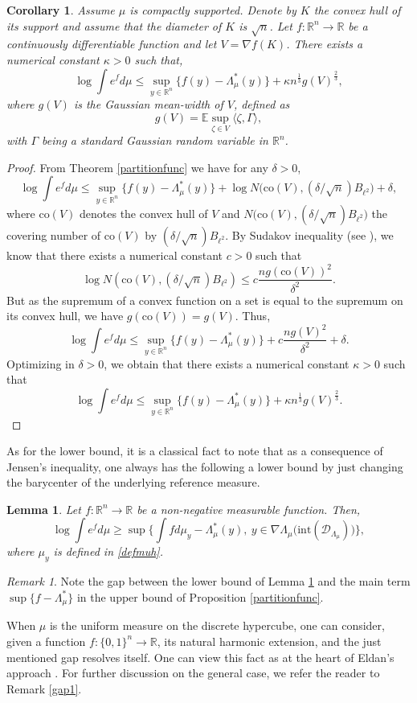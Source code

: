 \documentclass[aop,preprint]{imsart}
\newcommand\RR{\mathbb{R}}
\newcommand\EE{\mathbb{E}}
\numberwithin{equation}{section}
\theoremstyle{definition}
\theoremstyle{plain}
\newtheorem{Lem}[Def]{Lemma}
\newtheorem{Cor}[Def]{Corollary}
\theoremstyle{remark}
\newtheorem{Rem}[Def]{Remark}
\begin{document}
\begin{Cor}\label{GW}
Assume $\mu$ is compactly supported. Denote by $K$ the convex hull of its support and assume that the diameter of $K$ is $\sqrt{n}$. Let $f : \RR^n \to \RR$ be a continuously differentiable function and let $V = \nabla f(K)$. There exists a numerical constant $\kappa>0$ such that,
$$\log \int e^{f} d\mu \leq \sup_{y \in \RR^n} \{ f(y) -\Lambda^*_\mu(y)\}  +\kappa n^{\frac{1}{3}} g(V)^{\frac{2}{3}},$$
where $g(V)$ is the Gaussian mean-width of $V$, defined as
$$ g(V) = \EE \sup_{\zeta \in V} \langle \zeta , \Gamma \rangle,$$
with $\Gamma$ being a standard Gaussian random variable in $\RR^n$.
\end{Cor}
\begin{proof}
From Theorem \ref{partitionfunc} we have for any $\delta>0$,
$$\log \int e^{f} d\mu \leq \sup_{y \in \RR^n}  \{ f(y) -\Lambda^*_\mu(y)\}  + \log N\big(\mathrm{co}(V), (\delta/\sqrt{n}) B_{\ell^2}\big) +  \delta,$$
where $\mathrm{co}(V)$ denotes the convex hull of $V$ and $N\big(\mathrm{co}(V), (\delta/\sqrt{n}) B_{\ell^2}\big)$ the covering number of $\mathrm{co}(V)$ by $(\delta/\sqrt{n}) B_{\ell^2}$. By Sudakov inequality (see \cite[Theorem 3.18]{LT}), we know that there exists a numerical constant $c>0$ such that
$$  \log N(\mathrm{co}(V), (\delta/\sqrt{n}) B_{\ell^2})  \leq c \frac{n g(\mathrm{co}(V))^2}{\delta^2}.$$
But as the supremum of a convex function on a set is equal to the supremum on its convex hull, we have $g(\mathrm{co}(V)) = g(V)$. Thus,
$$\log \int e^{f} d\mu \leq \sup_{y \in \RR^n}  \{ f(y) -\Lambda^*_\mu(y)\}  +  c \frac{n g(V)^2}{\delta^2} +  \delta.$$
Optimizing in $\delta>0$, we obtain that there exists a numerical constant $\kappa>0$ such that
$$\log \int e^{f} d\mu \leq \sup_{y \in \RR^n}  \{ f(y) -\Lambda^*_\mu(y)\}  + \kappa n^{\frac{1}{3}} g(V)^{\frac{2}{3}}.$$
\end{proof}
As for the lower bound, it is a classical fact to note that as a consequence of Jensen's inequality,  one always has the following a lower bound by just changing the barycenter of the underlying reference measure. 
\begin{Lem}\label{lbpartition}Let $f : \RR^n\to \RR$ be a non-negative measurable function. Then,
$$ \log \int e^f d\mu \geq \sup \big\{ \int f d\mu_{y} - \Lambda^*_{\mu}(y), \ y \in \nabla \Lambda_\mu \big(\mathrm{int}(\mathcal{D}_{\Lambda_\mu}) \big) \big\},$$
where $\mu_y$ is defined in \eqref{defmuh}.
\end{Lem}
\begin{Rem}\label{gappartition}
Note the gap between the lower bound of Lemma \ref{lbpartition} and the main term $\sup\{ f -\Lambda^*_\mu\}$ in the upper bound of Proposition \ref{partitionfunc}. 

When $\mu$ is the uniform measure on the discrete hypercube, one can consider, given a function $f : \{0,1\}^n \to \RR$, its natural harmonic extension, and the just mentioned gap resolves itself. One can view this fact as at the heart of Eldan's approach \cite{Eldan}.
For further discussion on the general case, we refer the reader to Remark \ref{gap1}.

\end{Rem}
\end{document}
